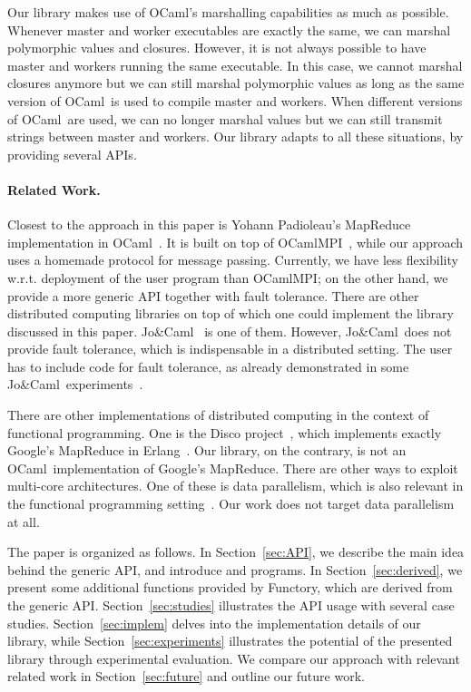 \documentclass[tfpsymp,pagenumbers]{tfp07symp}
\newcommand{\Ocaml}{OCaml}
\newcommand{\functory}{\textsf{Functory}}
\newcommand{\JoCaml}{Jo{\&\!}Caml}
\begin{document}
Our library makes use of \Ocaml's marshalling capabilities as much as
possible. Whenever master and worker executables are exactly the same,
we can marshal polymorphic values and closures. However, it is not
always possible to have master and workers running the same
executable. In this case, we cannot marshal closures anymore but we
can still marshal polymorphic values as long as the same version of
\Ocaml\ is used to compile master and workers. When different versions
of \Ocaml\ are used, we can no longer marshal values but we can still
transmit strings between master and workers. Our library adapts to all
these situations, by providing several APIs.


\paragraph{Related Work.}
Closest to the approach in this paper is Yohann Padioleau's MapReduce
implementation in \Ocaml~\cite{poor-man-mapreduce}.  It is built on
top of OCamlMPI~\cite{ocamlMPI}, while our approach uses a homemade
protocol for message passing.  Currently, we have less flexibility
w.r.t. deployment of the user program than OCamlMPI; on the other
hand, we provide a 
more generic API together with fault tolerance.  There are other
distributed computing libraries on top of which one could implement
the library discussed in this paper. \JoCaml~\cite{jocaml} is one of
them. However, \JoCaml\ does not provide fault tolerance, which is
indispensable in a distributed setting. The user has to include code
for fault tolerance, as already demonstrated in some \JoCaml\
experiments~\cite{mandel2008}. 

There are other implementations of distributed computing in the
context of functional programming. One is the Disco
project~\cite{disco}, which implements exactly Google's MapReduce in
Erlang~\cite{erlang}. Our library, on the contrary, is not an \Ocaml\
implementation of Google's MapReduce.
There are other ways to exploit multi-core architectures. One of these
is data parallelism, which is also relevant in the functional
programming setting~\cite{parallel-haskell}. Our work
does not target data parallelism at all.



\medskip
The paper is organized as follows. 
In Section~\ref{sec:API}, we
describe the main idea behind the generic API, and introduce
\of{master} and \of{worker} programs. 
In Section~\ref{sec:derived}, we
present some additional functions provided by \functory,
which are derived from the generic
API. 
Section~\ref{sec:studies} illustrates the API usage with several
case studies.
Section~\ref{sec:implem} delves into the implementation details
of our library, while Section~\ref{sec:experiments} illustrates the
potential of the presented library through experimental evaluation. We
compare our approach with relevant related work in
Section~\ref{sec:future} and outline our future work.
\end{document}
